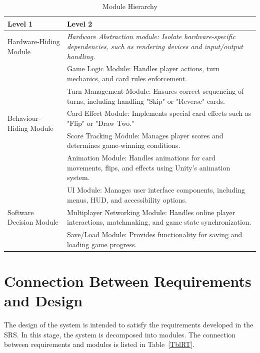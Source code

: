 \documentclass[12pt, titlepage]{article}
\begin{document}
\begin{table}[h!]
\centering
\begin{tabular}{p{} p{}}
\toprule
\textbf{Level 1} & \textbf{Level 2}\\
\midrule

{Hardware-Hiding Module} & \textit{Hardware Abstraction module: Isolate hardware-specific dependencies, such as rendering devices and input/output handling.}\\
\midrule

\multirow{5}{0.3\textwidth}{Behaviour-Hiding Module} 
& Game Logic Module: Handles player actions, turn mechanics, and card rules enforcement.\\
& Turn Management Module: Ensures correct sequencing of turns, including handling "Skip" or "Reverse" cards.\\
& Card Effect Module: Implements special card effects such as "Flip" or "Draw Two."\\
& Score Tracking Module: Manages player scores and determines game-winning conditions.\\
& Animation Module: Handles animations for card movements, flips, and effects using Unity's animation system.\\

\midrule

\multirow{3}{0.3\textwidth}{Software Decision Module} 
& UI Module: Manages user interface components, including menus, HUD, and accessibility options.\\
& Multiplayer Networking Module: Handles online player interactions, matchmaking, and game state synchronization.\\
& Save/Load Module: Provides functionality for saving and loading game progress.\\

\bottomrule

\end{tabular}
\caption{Module Hierarchy}
\label{TblMH}
\end{table}


\section{Connection Between Requirements and Design} \label{SecConnection}

The design of the system is intended to satisfy the requirements developed in
the SRS. In this stage, the system is decomposed into modules. The connection
between requirements and modules is listed in Table~\ref{TblRT}.
\end{document}
